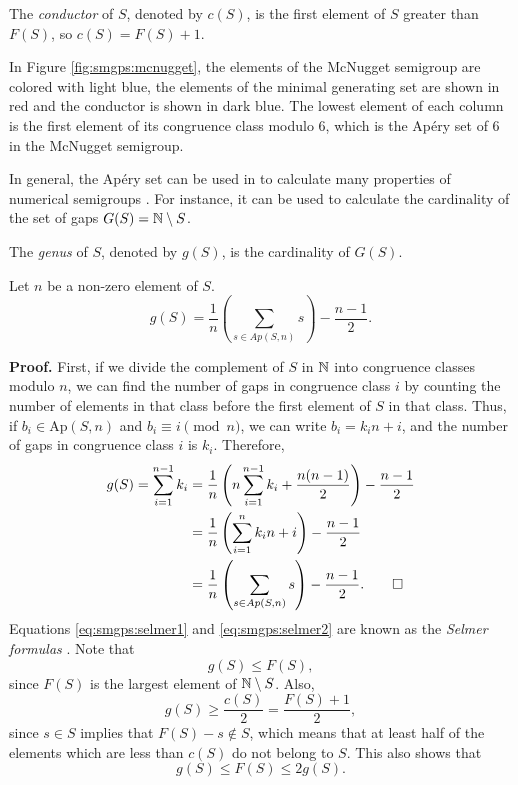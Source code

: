 \begin{definition}
    The \textit{conductor} of $S$, denoted by $c(S)$, is the first element of $S$ greater than $F(S)$, so $c(S) = F(S) + 1$.
\end{definition}
In Figure \ref{fig:smgps:mcnugget}, the elements of the McNugget semigroup are colored with light blue, the elements of the minimal generating set are shown in red and the conductor is shown in dark blue. The lowest element of each column is the first element of its congruence class modulo 6, which is the Apéry set of 6 in the McNugget semigroup. \par

In general, the Apéry set can be used in to calculate many properties of numerical semigroups \cite{apery1946branches}. For instance, it can be used to calculate the cardinality of the set of gaps $G(S) = \mathbb{N} \setminus S$.

\begin{definition}\label{def:smgps:genus}
    The \textit{genus} of $S$, denoted by $g(S)$, is the cardinality of $G(S)$.
\end{definition}

\begin{proposition} Let $n$ be a non-zero element of $S$. 
    \begin{equation}\label{eq:smgps:selmer2}
        g(S) = \frac{1}{n}\left(\sum_{s \in Ap(S, n)} s\right) - \frac{n - 1}{2}.
    \end{equation}
\end{proposition}
\textbf{Proof. } First, if we divide the complement of $S$ in $\mathbb{N}$ into congruence classes modulo $n$, we can find the number of gaps in congruence class $i$ by counting the number of elements in that class before the first element of $S$ in that class. Thus, if $b_i \in \mathrm{Ap}(S, n)$ and $b_i \equiv i \pmod n$, we can write $b_i = k_i n + i$, and the number of gaps in congruence class $i$ is $k_i$. Therefore,
\begin{align*}
    g(S) = \sum_{i = 1}^{n - 1} k_i &=  \frac{1}{n}\left(n\sum_{i = 1}^{n - 1} k_i + \frac{n(n - 1)}{2}\right) - \frac{n - 1}{2} \\
    &= \frac{1}{n}\left(\sum_{i = 1}^n k_i n + i \right) - \frac{n - 1}{2} \\
    &= \frac{1}{n}\left(\sum_{s \in Ap(S, n)} s \right) - \frac{n - 1}{2}. \qed
\end{align*}
Equations \ref{eq:smgps:selmer1} and \ref{eq:smgps:selmer2} are known as the \textit{Selmer formulas} \cite{selmer1977linear}. Note that \[g(S) \leq F(S),\] since $F(S)$ is the largest element of $\mathbb{N} \setminus S$. Also, 
\[g(S) \geq \frac{c(S)}{2} = \frac{F(S) + 1}{2},\]
since $s \in S$ implies that $F(S) - s \notin S$, which means that at least half of the elements which are less than $c(S)$ do not belong to $S$.  This also shows that
\begin{equation}\label{eq:smgps:frobgenus}
    g(S) \leq F(S) \leq 2g(S).
\end{equation}

